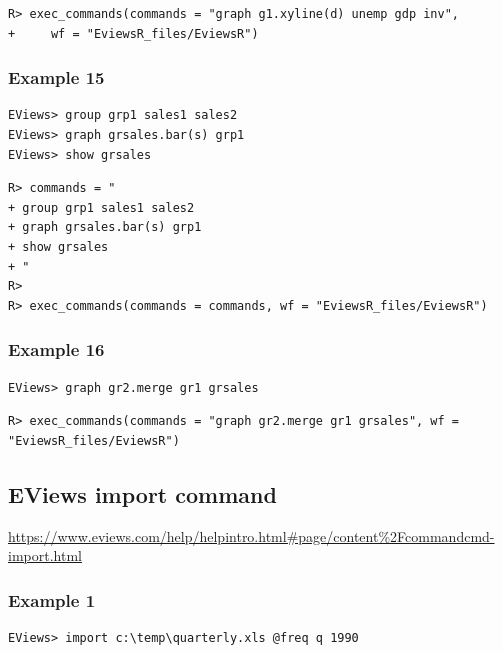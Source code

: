 \begin{verbatim}
R> exec_commands(commands = "graph g1.xyline(d) unemp gdp inv",
+     wf = "EviewsR_files/EviewsR")
\end{verbatim}

\hypertarget{example-15}{%
\subsubsection{Example 15}\label{example-15}}

\begin{verbatim}
EViews> group grp1 sales1 sales2
EViews> graph grsales.bar(s) grp1
EViews> show grsales
\end{verbatim}

\begin{verbatim}
R> commands = "
+ group grp1 sales1 sales2
+ graph grsales.bar(s) grp1
+ show grsales
+ "
R> 
R> exec_commands(commands = commands, wf = "EviewsR_files/EviewsR")
\end{verbatim}

\hypertarget{example-16}{%
\subsubsection{Example 16}\label{example-16}}

\begin{verbatim}
EViews> graph gr2.merge gr1 grsales
\end{verbatim}

\begin{verbatim}
R> exec_commands(commands = "graph gr2.merge gr1 grsales", wf = "EviewsR_files/EviewsR")
\end{verbatim}

\hypertarget{eviews-import-command}{%
\subsection{EViews import command}\label{eviews-import-command}}

\url{https://www.eviews.com/help/helpintro.html\#page/content\%2Fcommandcmd-import.html}

\hypertarget{example-1-1}{%
\subsubsection{Example 1}\label{example-1-1}}

\begin{verbatim}
EViews> import c:\temp\quarterly.xls @freq q 1990
\end{verbatim}

